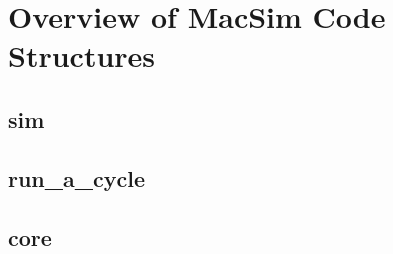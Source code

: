 
\chapter{Overview of MacSim Code Structures}
\label{sec:codetop}


\section{sim}

\section{run\_a\_cycle}

\section{core}
